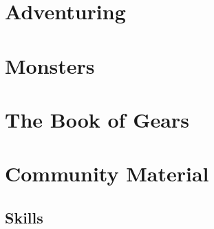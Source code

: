 \documentclass[10pt]{report}
\begin{document}






%



\chapter{Adventuring}









\chapter{Monsters}





\appendix

\chapter{The Book of Gears}


\chapter{Community Material}


\section{Skills}


%


\end{document}
